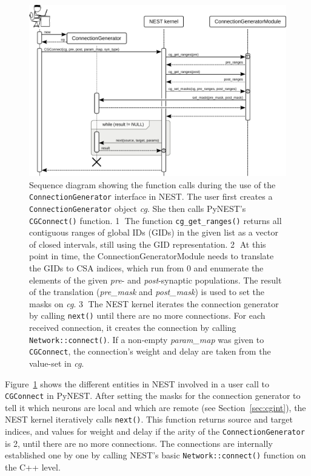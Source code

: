 \documentclass{frontiersSCNS} %
\newcommand{\INLINEFIGS}{} %
\newcommand{\Figure}[2]{Figure~\ref{#2}}
\newcommand{\Figure}[2]{Figure~#1}
\begin{document}
\ifdefined\INLINEFIGS
\begin{figure}[ht]
\centering
\includegraphics[scale=.8]{figures/sequence_diagram_nest.pdf}
\caption{Sequence diagram showing the function calls during the use of
  the \texttt{ConnectionGenerator} interface in NEST. The user first
  creates a \texttt{ConnectionGenerator} object \emph{cg}. She then
  calls PyNEST's \texttt{CGConnect()}
  function. \textcircled{\footnotesize 1} The function
  \texttt{cg\_get\_ranges()} returns all contiguous ranges of global
  IDs (GIDs) in the given list as a vector of closed intervals, still
  using the GID representation.  \textcircled{\footnotesize 2} At this
  point in time, the ConnectionGeneratorModule needs to translate the
  GIDs to CSA indices, which run from 0 and enumerate the elements of
  the given \emph{pre}- and \emph{post}-synaptic populations. The
  result of the translation (\emph{pre\_mask} and \emph{post\_mask})
  is used to set the masks on \emph{cg}. \textcircled{\footnotesize 3}
  The NEST kernel iterates the connection generator by calling
  \texttt{next()} until there are no more connections. For each
  received connection, it creates the connection by calling
  \texttt{Network::connect()}. If a non-empty \emph{param\_map} was
  given to \texttt{CGConnect}, the connection's weight and delay are
  taken from the value-set in
  \emph{cg}.}\label{fig:sequence_diagram_nest}
\end{figure}
\fi

\Figure{3}{fig:sequence_diagram_nest} shows the different entities in
NEST involved in a user call to \verb|CGConnect| in PyNEST. After
setting the masks for the connection generator to tell it which
neurons are local and which are remote (see Section~\ref{sec:cgint}),
the NEST kernel iteratively calls \verb|next()|. This function returns
source and target indices, and values for weight and delay if the
arity of the \verb|ConnectionGenerator| is 2, until there are no more
connections. The connections are internally established one by one by
calling NEST's basic \verb|Network::connect()| function on the C++
level.
\end{document}
